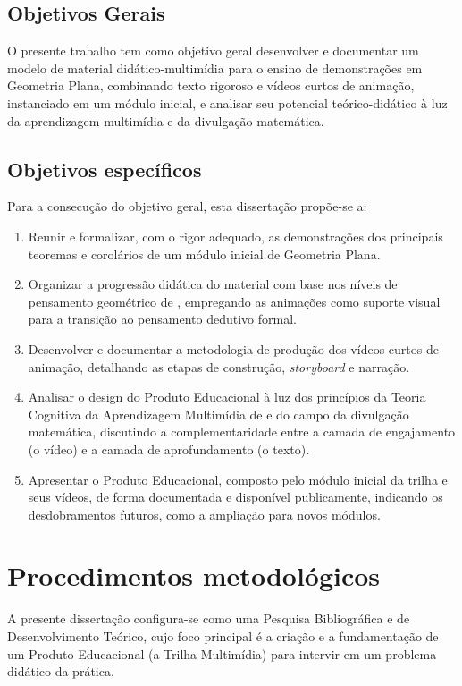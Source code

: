 \subsection{Objetivos Gerais}
O presente trabalho tem como objetivo geral desenvolver e documentar um modelo de material didático-multimídia para o ensino de demonstrações em Geometria Plana, combinando texto rigoroso e vídeos curtos de animação, instanciado em um módulo inicial, e analisar seu potencial teórico-didático à luz da aprendizagem multimídia e da divulgação matemática.
\subsection{Objetivos específicos}

Para a consecução do objetivo geral, esta dissertação propõe-se a:

\begin{enumerate}
    \item Reunir e formalizar, com o rigor adequado, as demonstrações dos principais teoremas e corolários de um módulo inicial de Geometria Plana.

    \item Organizar a progressão didática do material com base nos níveis de pensamento geométrico de , empregando as animações como suporte visual para a transição ao pensamento dedutivo formal.

    \item Desenvolver e documentar a metodologia de produção dos vídeos curtos de animação, detalhando as etapas de construção, \textit{storyboard} e narração.

    \item Analisar o design do Produto Educacional à luz dos princípios da Teoria Cognitiva da Aprendizagem Multimídia de  e do campo da divulgação matemática, discutindo a complementaridade entre a camada de engajamento (o vídeo) e a camada de aprofundamento (o texto).

    \item Apresentar o Produto Educacional, composto pelo módulo inicial da trilha e seus vídeos, de forma documentada e disponível publicamente, indicando os desdobramentos futuros, como a ampliação para novos módulos.
\end{enumerate}

 
\section{Procedimentos metodológicos}
A presente dissertação configura-se como uma Pesquisa Bibliográfica e de Desenvolvimento Teórico, cujo foco principal é a criação e a fundamentação de um Produto Educacional (a Trilha Multimídia) para intervir em um problema didático da prática.

